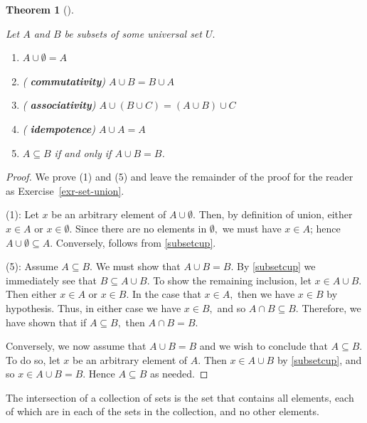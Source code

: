 \documentclass[
  letterpaper,
  10pt,
  reqno,
  twopage,
  openany]{book}
\providecommand{\tightlist}{%
  \setlength{\itemsep}{0pt}\setlength{\parskip}{0pt}}\usepackage{longtable,booktabs,array}
\theoremstyle{plain}
\theoremstyle{definition}
\theoremstyle{definition}
\theoremstyle{definition}
\theoremstyle{plain}
\theoremstyle{plain}
\newtheorem{theorem}{Theorem}[chapter]
\theoremstyle{remark}
\begin{document}
\leavevmode{}%
\begin{theorem}[]\label{thm-set-union}

Let \(A\) and \(B\) be subsets of some universal set \(U.\)

\begin{enumerate}
\def\labelenumi{\arabic{enumi}.}
\tightlist
\item
  \(A\cup \emptyset =A\)
\item
  ( \textbf{commutativity}) \(A\cup B=B\cup A\)
\item
  ( \textbf{associativity})
  \(A\cup (B \cup C) =(A\cup B)\cup C\)
\item
  ( \textbf{idempotence}) \(A \cup A =A\)
\item
  \(A\subseteq B\) if and only if \(A\cup B=B\).
\end{enumerate}

\end{theorem}

\begin{proof}

We prove (1) and (5) and leave the remainder of the proof for the reader
as Exercise~\ref{exr-set-union}.

(1): Let \(x\) be an arbitrary element of \(A\cup \emptyset.\) Then, by
definition of union, either \(x\in A\) or \(x\in \emptyset.\) Since
there are no elements in \(\emptyset,\) we must have \(x\in A\); hence
\(A\cup \emptyset\subseteq A.\) Conversely, follows from
\eqref{subsetcup}.

(5): Assume \(A\subseteq B.\) We must show that \(A\cup B=B.\) By
\eqref{subsetcup} we immediately see that \(B\subseteq A\cup B.\) To
show the remaining inclusion, let \(x\in A\cup B.\) Then either
\(x\in A\) or \(x\in B.\) In the case that \(x\in A,\) then we have
\(x\in B\) by hypothesis. Thus, in either case we have \(x\in B,\) and
so \(A\cap B\subseteq B.\) Therefore, we have shown that if
\(A\subseteq B,\) then \(A\cap B=B.\)

Conversely, we now assume that \(A\cup B=B\) and we wish to conclude
that \(A\subseteq B.\) To do so, let \(x\) be an arbitrary element of
\(A.\) Then \(x\in A\cup B\) by \eqref{subsetcup}, and so
\(x\in A\cup B=B.\) Hence \(A\subseteq B\) as needed.

\end{proof}

The intersection of a collection of sets is the set that contains all
elements, each of which are in each of the sets in the collection, and
no other elements.
\end{document}
